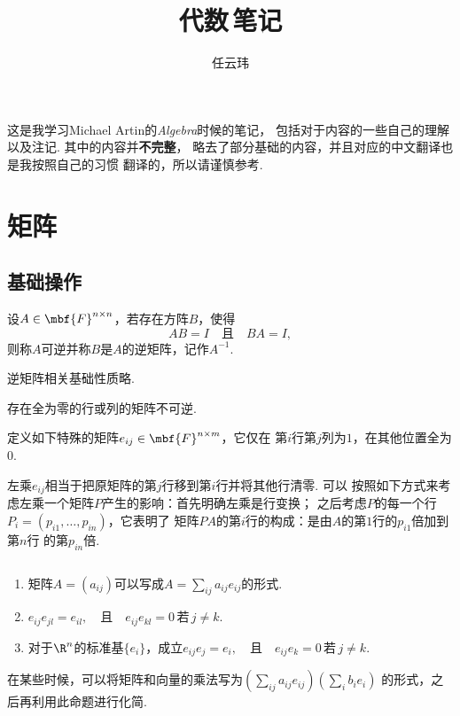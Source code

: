 

\title{代数$\,$笔记}
\author{任云玮}
\date{}



\maketitle
\tableofcontents
\newpage

  这是我学习Michael Artin的\textit{Algebra}时候的笔记，
  包括对于内容的一些自己的理解以及注记. 其中的内容并\textbf{不完整}，
  略去了部分基础的内容，并且对应的中文翻译也是我按照自己的习惯
  翻译的，所以请谨慎参考.

\section{矩阵}
\subsection{基础操作}

  \begin{defi}[逆]
    设$A\in\mbf{F}^{n\times n}$，若存在方阵$B$，使得
    \begin{equation*}
      AB=I \quad \text{且} \quad BA=I,
    \end{equation*}
    则称$A$可逆并称$B$是$A$的逆矩阵，记作$A^{-1}$.
  \end{defi}
  \remark
    逆矩阵相关基础性质略.

  \begin{lemma}[不可逆]
    存在全为零的行或列的矩阵不可逆.
  \end{lemma}

  \begin{defi}
    \label{defi: 矩阵元}
    定义如下特殊的矩阵$e_{ij}\in\mbf{F}^{n\times m}$，它仅在
    第$i$行第$j$列为$1$，在其他位置全为$0$.
  \end{defi}
  \remark
    左乘$e_{ij}$相当于把原矩阵的第$j$行移到第$i$行并将其他行清零. 可以
    按照如下方式来考虑左乘一个矩阵$P$产生的影响：首先明确左乘是行变换；
    之后考虑$P$的每一个行$P_i = (p_{i1},\dots,p_{in})$，它表明了
    矩阵$PA$的第$i$行的构成：是由$A$的第$1$行的$p_{i1}$倍加到第$n$行
    的第$p_{in}$倍.

  \begin{pos}[矩阵元的性质]
    \label{pos: 矩阵元的性质}
    $\,$
    \begin{enumerate}
      \item 矩阵$A=(a_{ij})$可以写成$A=\sum_{ij}a_{ij}e_{ij}$的形式.
      \item $e_{ij}e_{jl} = e_{il},\quad\text{且}\quad e_{ij}e_{kl}=0
            \,\text{若}\,j\ne k$.
      \item 对于$\R^n$的标准基$\{e_i\}$，成立$e_{ij}e_j=e_i,\quad\text{且}
            \quad e_{ij}e_k=0\,\text{若}\, j\ne k$.
    \end{enumerate}
  \end{pos}
  \remark
    在某些时候，可以将矩阵和向量的乘法写为$(\sum_{ij}a_{ij}e_{ij})(\sum_ib_ie_i)$
    的形式，之后再利用此命题进行化简.

